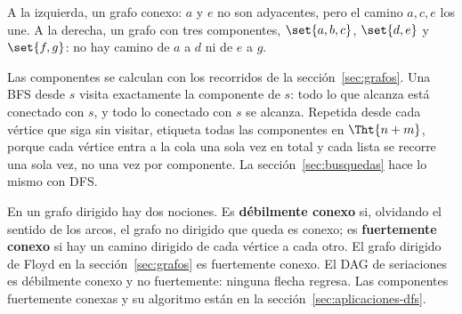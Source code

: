 \documentclass[11pt,letterpaper]{article}
\begin{document}
\begin{ejemplo}[Diapositivas 95 y 100]
  \label{ej:componentes-teoria}
  A la izquierda, un grafo conexo: $a$ y $e$ no son adyacentes, pero
  el camino $a, c, e$ los une. A la derecha, un grafo con tres
  componentes, $\set{a,b,c}$, $\set{d,e}$ y $\set{f,g}$: no hay camino
  de $a$ a $d$ ni de $e$ a $g$.
  \begin{center}
  \end{center}
\end{ejemplo}

Las componentes se calculan con los recorridos de la
sección~\ref{sec:grafos}. Una BFS desde $s$ visita exactamente la
componente de $s$: todo lo que alcanza está conectado con $s$, y todo
lo conectado con $s$ se alcanza. Repetida desde cada vértice que siga
sin visitar, etiqueta todas las componentes en $\Tht{n + m}$, porque
cada vértice entra a la cola una sola vez en total y cada lista se
recorre una sola vez, no una vez por componente. La
sección~\ref{sec:busquedas} hace lo mismo con DFS.

En un grafo dirigido hay dos nociones. Es \textbf{débilmente conexo}
si, olvidando el sentido de los arcos, el grafo no dirigido que queda
es conexo; es \textbf{fuertemente conexo} si hay un camino dirigido de
cada vértice a cada otro. El grafo dirigido de Floyd en la
sección~\ref{sec:grafos} es fuertemente conexo. El DAG de seriaciones
es débilmente conexo y no fuertemente: ninguna flecha regresa. Las
componentes fuertemente conexas y su algoritmo están en la
sección~\ref{sec:aplicaciones-dfs}.
\end{document}
